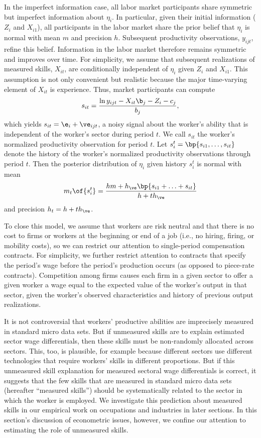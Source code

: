 \documentclass[12pt]{article}
\theoremstyle{definition}
\begin{document}
In the imperfect information case, all labor market participants share symmetric but imperfect information about $\eta_i$. In particular, given their initial information ($Z_i$ and $X_{i1}$), all participants in the labor market share the prior belief that $\eta_i$ is normal with mean $m$ and precision $h$. Subsequent productivity observations, $y_{ijt}$, refine this belief. Information in the labor market therefore remains symmetric and improves over time. For simplicity, we assume that subsequent realizations of measured skills, $X_{it}$, are conditionally independent of $\eta_i$ given $Z_i$ and $X_{i1}$. This assumption is not only convenient but realistic because the major time-varying element of $X_{it}$ is experience. Thus, market participants can compute 
\begin{equation}
    \label{3}
    s_{it} = \frac{\ln y_{ijt} - X_{it} \b_j - Z_i - c_j}{b_j},
\end{equation}
which yields $s_{it} = \e_i + \ve_{ijt}$, a noisy signal about the worker's ability that is independent of the worker's sector during period $t$. We call $s_{it}$ the worker's normalized productivity observation for period $t$. Let $s_i^t = \bp{s_{i1}, \ldots, s_{it}}$ denote the history of the worker's normalized productivity observations through period $t$. Then the posterior distribution of $\eta_i$ given history $s_i^t$ is normal with mean 
\begin{equation}
    \label{4}
    m_t\of{s_i^t} = \frac{hm + h_\ve \bp{s_{i1}+ \ldots+ s_{it}}}{h + t h_\ve}
\end{equation}
and precision $h_t = h + t h_{\ve}$.

To close this model, we assume that workers are risk neutral and that there is no cost to firms or workers at the beginning or end of a job (i.e., no hiring, firing, or mobility costs), so we can restrict our attention to single-period compensation contracts. For simplicity, we further restrict attention to contracts that specify the period's wage before the period's production occurs (as opposed to piece-rate contracts). Competition among firms causes each firm in a given sector to offer a given worker a wage equal to the expected value of the worker's output in that sector, given the worker's observed characteristics and history of previous output realizations. 

It is not controversial that workers' productive abilities are imprecisely measured in standard micro data sets. But if unmeasured skills are to explain estimated sector wage differentials, then these skills must be non-randomly allocated across sectors. This, too, is plausible, for example because different sectors use different technologies that require workers' skills in different proportions. But if this unmeasured skill explanation for measured sectoral wage differentials is correct, it suggests that the few skills that are measured in standard micro data sets (hereafter ``measured skills'') should be systematically related to the sector in which the worker is employed. We investigate this prediction about measured skills in our empirical work on occupations and industries in later sections. In this section's discussion of econometric issues, however, we confine our attention to estimating the role of unmeasured skills. 
\end{document}
